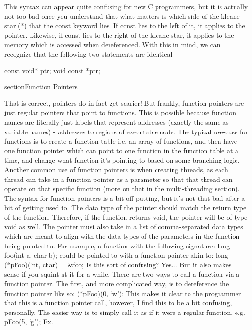 \documentclass{article}
\begin{document}
This syntax can appear quite confusing for new C programmers, but it is actually not too bad once you
understand that what matters is which side of the kleane star (*) that the const keyword lies. If const lies
to the left of it, it applies to the pointer. Likewise, if const lies to the right of the kleane star, it
applies to the memory which is accessed when dereferenced. With this in mind, we can recognize that the
following two statements are identical:

\begin{cblk}
const void* ptr;
void const *ptr;
\end{cblk}

section{Function Pointers}

That is correct, pointers do in fact get scarier! But frankly, function pointers are just regular pointers
that point to functions. This is possible because function names are literally just labels that represent
addresses (exactly the same as variable names) - addresses to regions of executable code. The typical
use-case for functions is to create a function table i.e. an array of functions, and then have one function
pointer which can point to one function in the function table at a time, and change what function it’s
pointing to based on some branching logic. Another common use of function pointers is when creating threads,
as each thread can take in a function pointer as a parameter so that that thread can operate on that specific
function (more on that in the multi-threading section). The syntax for function pointers is a bit off-putting,
but it’s not that bad after a bit of getting used to. The data type of the pointer should match the return
type of the function. Therefore, if the function returns void, the pointer will be of type void as well. The
pointer must also take in a list of comma-separated data types which are meant to align with the data types
of the parameters in the function being pointed to. For example, a function with the following signature:
long foo(int a, char b); could be pointed to with a function pointer akin to: long (*pFoo)(int, char) =
&foo;  Is this sort of confusing? Yes... But it also makes sense if you squint at it for a while. There are
two ways to call a function via a function pointer. The first, and more complicated way, is to dereference
the function pointer like so: (*pFoo)(0, ‘w’); This makes it clear to the programmer that this is a function
pointer call, however, I find this to be a bit confusing, personally. The easier way is to simply call it as
if it were a regular function, e.g. pFoo(5, ‘g’); Ex.
\end{document}
